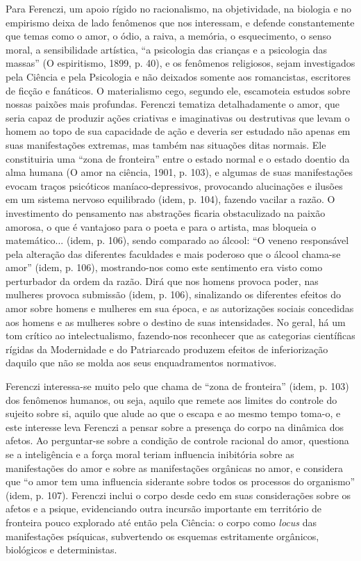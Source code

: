 Para Ferenczi, um apoio rígido no racionalismo, na objetividade, na
biologia e no empirismo deixa de lado fenômenos que nos interessam, e
defende constantemente que temas como o amor, o ódio, a raiva, a
memória, o esquecimento, o senso moral, a sensibilidade artística, ``a
psicologia das crianças e a psicologia das massas'' (O espiritismo,
1899, p. 40), e os fenômenos religiosos, sejam investigados pela Ciência
e pela Psicologia e não deixados somente aos romancistas, escritores de
ficção e fanáticos. O materialismo cego, segundo ele, escamoteia estudos
sobre nossas paixões mais profundas. Ferenczi tematiza detalhadamente o
amor, que seria capaz de produzir ações criativas e imaginativas ou
destrutivas que levam o homem ao topo de sua capacidade de ação e
deveria ser estudado não apenas em suas manifestações extremas, mas
também nas situações ditas normais. Ele constituiria uma ``zona de
fronteira'' entre o estado normal e o estado doentio da alma humana (O
amor na ciência, 1901, p. 103), e algumas de suas manifestações evocam
traços psicóticos maníaco-depressivos, provocando alucinações e ilusões
em um sistema nervoso equilibrado (idem, p. 104), fazendo vacilar a
razão. O investimento do pensamento nas abstrações ficaria obstaculizado
na paixão amorosa, o que é vantajoso para o poeta e para o artista, mas
bloqueia o matemático... (idem, p. 106), sendo comparado ao álcool: ``O
veneno responsável pela alteração das diferentes faculdades e mais
poderoso que o álcool chama-se amor'' (idem, p. 106), mostrando-nos como
este sentimento era visto como perturbador da ordem da razão. Dirá que
nos homens provoca poder, nas mulheres provoca submissão (idem, p. 106),
sinalizando os diferentes efeitos do amor sobre homens e mulheres em sua
época, e as autorizações sociais concedidas aos homens e as mulheres
sobre o destino de suas intensidades. No geral, há um tom crítico ao
intelectualismo, fazendo-nos reconhecer que as categorias científicas
rígidas da Modernidade e do Patriarcado produzem efeitos de
inferiorização daquilo que não se molda aos seus enquadramentos
normativos.

Ferenczi interessa-se muito pelo que chama de ``zona de fronteira''
(idem, p. 103) dos fenômenos humanos, ou seja, aquilo que remete aos
limites do controle do sujeito sobre si, aquilo que alude ao que o
escapa e ao mesmo tempo toma-o, e este interesse leva Ferenczi a pensar
sobre a presença do corpo na dinâmica dos afetos. Ao perguntar-se sobre
a condição de controle racional do amor, questiona se a inteligência e a
força moral teriam influencia inibitória sobre as manifestações do amor
e sobre as manifestações orgânicas no amor, e considera que ``o amor tem
uma influencia siderante sobre todos os processos do organismo'' (idem,
p. 107). Ferenczi inclui o corpo desde cedo em suas considerações sobre
os afetos e a psique, evidenciando outra incursão importante em
território de fronteira pouco explorado até então pela Ciência: o corpo
como \emph{locus} das manifestações psíquicas, subvertendo os esquemas
estritamente orgânicos, biológicos e deterministas.

